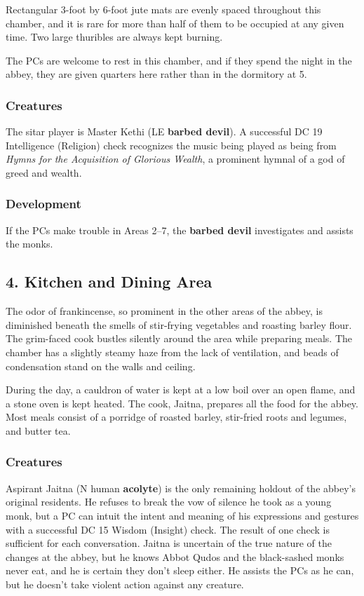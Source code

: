 \documentclass[10pt,a4paper,twoside,bg=print,twocolumn,openany,nodeprecatedcode]{dndbook}
\begin{document}
Rectangular 3-foot by 6-foot jute mats are evenly spaced throughout this chamber, and it is rare for more than half of them to be occupied at any given time. Two large thuribles are always kept burning.

The PCs are welcome to rest in this chamber, and if they spend the night in the abbey, they are given quarters here rather than in the dormitory at 5.

\subsubsection{Creatures}
The sitar player is Master Kethi (LE \textbf{barbed devil}). A successful DC 19 Intelligence (Religion) check recognizes the music being played as being from \textit{Hymns for the Acquisition of Glorious Wealth}, a prominent hymnal of a god of greed and wealth.

\subsubsection{Development}
If the PCs make trouble in Areas 2–7, the \textbf{barbed devil} investigates and assists the monks.

\subsection{4. Kitchen and Dining Area}
\begin{DndReadAloud}{}
The odor of frankincense, so prominent in the other areas of the abbey, is diminished beneath the smells of stir-frying vegetables and roasting barley flour. The grim-faced cook bustles silently around the area while preparing meals. The chamber has a slightly steamy haze from the lack of ventilation, and beads of condensation stand on the walls and ceiling.

\end{DndReadAloud}

During the day, a cauldron of water is kept at a low boil over an open flame, and a stone oven is kept heated. The cook, Jaitna, prepares all the food for the abbey. Most meals consist of a porridge of roasted barley, stir-fried roots and legumes, and butter tea.

\subsubsection{Creatures}
Aspirant Jaitna (N human \textbf{acolyte}) is the only remaining holdout of the abbey's original residents. He refuses to break the vow of silence he took as a young monk, but a PC can intuit the intent and meaning of his expressions and gestures with a successful DC 15 Wisdom (Insight) check. The result of one check is sufficient for each conversation. Jaitna is uncertain of the true nature of the changes at the abbey, but he knows Abbot Qudos and the black-sashed monks never eat, and he is certain they don't sleep either. He assists the PCs as he can, but he doesn't take violent action against any creature.
\end{document}
